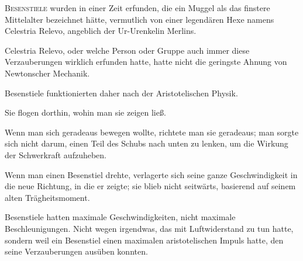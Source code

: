 
\lettrine{B}{esenstiele} wurden in einer Zeit erfunden, die ein Muggel als das finstere Mittelalter bezeichnet hätte, vermutlich von einer legendären Hexe namens Celestria Relevo, angeblich der Ur-Urenkelin Merlins.

Celestria Relevo, oder welche Person oder Gruppe auch immer diese Verzauberungen wirklich erfunden hatte, hatte nicht die geringste Ahnung von Newtonscher Mechanik.

Besenstiele funktionierten daher nach der Aristotelischen Physik.

Sie flogen dorthin, wohin man sie zeigen ließ.

Wenn man sich geradeaus bewegen wollte, richtete man sie geradeaus; man sorgte sich nicht darum, einen Teil des Schubs nach unten zu lenken, um die Wirkung der Schwerkraft aufzuheben.

Wenn man einen Besenstiel drehte, verlagerte sich seine ganze Geschwindigkeit in die neue Richtung, in die er zeigte; sie blieb nicht seitwärts, basierend auf seinem alten Trägheitsmoment.

Besenstiele hatten maximale Geschwindigkeiten, nicht maximale Beschleunigungen. Nicht wegen irgendwas, das mit Luftwiderstand zu tun hatte, sondern weil ein Besenstiel einen maximalen aristotelischen Impuls hatte, den seine Verzauberungen ausüben konnten.


